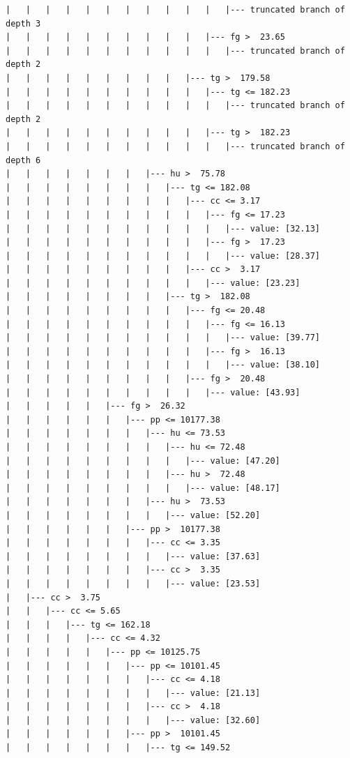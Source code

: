 \documentclass[UTF8, a4paper]{ctexart}
\begin{document}
\begin{lstlisting}
|   |   |   |   |   |   |   |   |   |   |   |--- truncated branch of depth 3
|   |   |   |   |   |   |   |   |   |   |--- fg >  23.65
|   |   |   |   |   |   |   |   |   |   |   |--- truncated branch of depth 2
|   |   |   |   |   |   |   |   |   |--- tg >  179.58
|   |   |   |   |   |   |   |   |   |   |--- tg <= 182.23
|   |   |   |   |   |   |   |   |   |   |   |--- truncated branch of depth 2
|   |   |   |   |   |   |   |   |   |   |--- tg >  182.23
|   |   |   |   |   |   |   |   |   |   |   |--- truncated branch of depth 6
|   |   |   |   |   |   |   |--- hu >  75.78
|   |   |   |   |   |   |   |   |--- tg <= 182.08
|   |   |   |   |   |   |   |   |   |--- cc <= 3.17
|   |   |   |   |   |   |   |   |   |   |--- fg <= 17.23
|   |   |   |   |   |   |   |   |   |   |   |--- value: [32.13]
|   |   |   |   |   |   |   |   |   |   |--- fg >  17.23
|   |   |   |   |   |   |   |   |   |   |   |--- value: [28.37]
|   |   |   |   |   |   |   |   |   |--- cc >  3.17
|   |   |   |   |   |   |   |   |   |   |--- value: [23.23]
|   |   |   |   |   |   |   |   |--- tg >  182.08
|   |   |   |   |   |   |   |   |   |--- fg <= 20.48
|   |   |   |   |   |   |   |   |   |   |--- fg <= 16.13
|   |   |   |   |   |   |   |   |   |   |   |--- value: [39.77]
|   |   |   |   |   |   |   |   |   |   |--- fg >  16.13
|   |   |   |   |   |   |   |   |   |   |   |--- value: [38.10]
|   |   |   |   |   |   |   |   |   |--- fg >  20.48
|   |   |   |   |   |   |   |   |   |   |--- value: [43.93]
|   |   |   |   |   |--- fg >  26.32
|   |   |   |   |   |   |--- pp <= 10177.38
|   |   |   |   |   |   |   |--- hu <= 73.53
|   |   |   |   |   |   |   |   |--- hu <= 72.48
|   |   |   |   |   |   |   |   |   |--- value: [47.20]
|   |   |   |   |   |   |   |   |--- hu >  72.48
|   |   |   |   |   |   |   |   |   |--- value: [48.17]
|   |   |   |   |   |   |   |--- hu >  73.53
|   |   |   |   |   |   |   |   |--- value: [52.20]
|   |   |   |   |   |   |--- pp >  10177.38
|   |   |   |   |   |   |   |--- cc <= 3.35
|   |   |   |   |   |   |   |   |--- value: [37.63]
|   |   |   |   |   |   |   |--- cc >  3.35
|   |   |   |   |   |   |   |   |--- value: [23.53]
|   |--- cc >  3.75
|   |   |--- cc <= 5.65
|   |   |   |--- tg <= 162.18
|   |   |   |   |--- cc <= 4.32
|   |   |   |   |   |--- pp <= 10125.75
|   |   |   |   |   |   |--- pp <= 10101.45
|   |   |   |   |   |   |   |--- cc <= 4.18
|   |   |   |   |   |   |   |   |--- value: [21.13]
|   |   |   |   |   |   |   |--- cc >  4.18
|   |   |   |   |   |   |   |   |--- value: [32.60]
|   |   |   |   |   |   |--- pp >  10101.45
|   |   |   |   |   |   |   |--- tg <= 149.52

\end{lstlisting}
\end{document}
